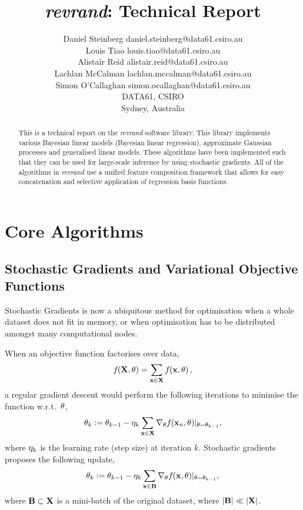 \documentclass[11pt, oneside]{article}
\title{\emph{revrand}: Technical Report}
\author{\name Daniel Steinberg \email daniel.steinberg@data61.csiro.au \\
        \name Louis Tiao \email louis.tiao@data61.csiro.au \\
        \name Alistair Reid \email alistair.reid@data61.csiro.au \\
        \name Lachlan McCalman \email lachlan.mccalman@data61.csiro.au \\
        \name Simon O'Callaghan \email simon.ocallaghan@data61.csiro.au \\
        \addr DATA61, CSIRO \\
        Sydney, Australia}
\date{}
\begin{document}
\maketitle

\begin{abstract}
    This is a technical report on the \emph{revrand} software library. This
    library implements various Bayesian linear models (Bayesian linear
    regression), approximate Gaussian processes and generalised linear models.
    These algorithms have been implemented such that they can be used for
    large-scale inference by using stochastic gradients. All of the algorithms
    in \emph{revrand} use a unified feature composition framework that allows
    for easy concatenation and selective application of regression basis
    functions.
\end{abstract}

\tableofcontents

\section{Core Algorithms}

\subsection{Stochastic Gradients and Variational Objective Functions}
\label{sub:stochvar}

Stochastic Gradients is now a ubiquitous method for optimisation when a whole
dataset does not fit in memory, or when optimisation has to be distributed
amongst many computational nodes.

When an objective function factorises over data,
\begin{equation}
    {f}_{}\!\left({{\mathbf{X}, \theta}}\right) = \sum_{\mathbf{x} \in \mathbf{X}} {f}_{}\!\left({{\mathbf{x}, \theta}}\right),
\end{equation}
a regular gradient descent would perform the following iterations to minimise
the function w.r.t.\ $\theta$,
\begin{equation}
    \theta_k := \theta_{k-1} - \eta_k \sum_{\mathbf{x} \in \mathbf{X}}
    \nabla_{\theta} {f}_{}\!\left({{\mathbf{x}_n, \theta}}\right)\!|_{\theta = \theta_{k-1}},
\end{equation}
where $\eta_k$ is the learning rate (step size) at iteration $k$. Stochastic
gradients proposes the following update,
\begin{equation}
    \theta_k := \theta_{k-1} - \eta_k \sum_{\mathbf{x} \in \mathbf{B}}
    \nabla_{\theta} {f}_{}\!\left({{\mathbf{x}, \theta}}\right)\!|_{\theta = \theta_{k-1}},
    \label{eq:sg}
\end{equation}
where $\mathbf{B} \subset \mathbf{X}$ is a mini-batch of the original dataset, where
$|\mathbf{B}| \ll |\mathbf{X}|$.
\end{document}
